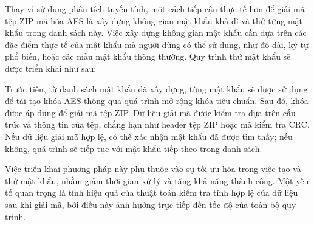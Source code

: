 \documentclass[../DoAn.tex]{subfiles}
\begin{document}
Thay vì sử dụng phân tích tuyến tính, một cách tiếp cận thực tế hơn để giải mã tệp ZIP mã hóa AES là xây dựng không gian mật khẩu khả dĩ và thử từng mật khẩu trong danh sách này. Việc xây dựng không gian mật khẩu cần dựa trên các đặc điểm thực tế của mật khẩu mà người dùng có thể sử dụng, như độ dài, ký tự phổ biến, hoặc các mẫu mật khẩu thông thường. Quy trình thử mật khẩu sẽ được triển khai như sau:

Trước tiên, từ danh sách mật khẩu đã xây dựng, từng mật khẩu sẽ được sử dụng để tái tạo khóa AES thông qua quá trình mở rộng khóa tiêu chuẩn. Sau đó, khóa được áp dụng để giải mã tệp ZIP. Dữ liệu giải mã được kiểm tra dựa trên cấu trúc và thông tin của tệp, chẳng hạn như header tệp ZIP hoặc mã kiểm tra CRC. Nếu dữ liệu giải mã hợp lệ, có thể xác nhận mật khẩu đã được tìm thấy; nếu không, quá trình sẽ tiếp tục với mật khẩu tiếp theo trong danh sách.

Việc triển khai phương pháp này phụ thuộc vào sự tối ưu hóa trong việc tạo và thử mật khẩu, nhằm giảm thời gian xử lý và tăng khả năng thành công. Một yếu tố quan trọng là tính hiệu quả của thuật toán kiểm tra tính hợp lệ của dữ liệu sau khi giải mã, bởi điều này ảnh hưởng trực tiếp đến tốc độ của toàn bộ quy trình.
\end{document}
